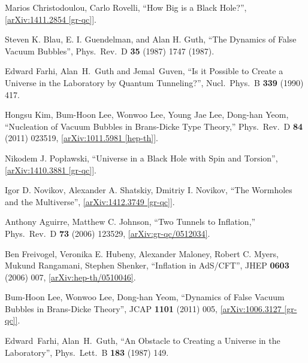 \documentclass[12pt]{article}
\newcommand{\2}{$^2$}
\newcommand{\3}{$^3$}
\newcommand{\4}{$_4$}
\newcommand{\5}{$_5$}
\begin{document}
\begin{thebibliography}{400}
Marios Christodoulou, Carlo Rovelli, ``How Big is a Black Hole?'', \href{http://arxiv.org/abs/1411.2854}{[arXiv:1411.2854 [gr-qc]]}. 

Steven K. Blau, E. I. Guendelman, and Alan H. Guth,
  ``The Dynamics of False Vacuum Bubbles'',
  Phys.\ Rev.\ D {\bf 35} (1987) 1747 (1987).

  Edward Farhi, Alan~H.~Guth and Jemal~Guven,
  ``Is it Possible to Create a Universe in the Laboratory by Quantum Tunneling?'',
  Nucl.\ Phys.\  B {\bf 339} (1990) 417.
	

  Hongsu Kim, Bum-Hoon Lee, Wonwoo Lee, Young Jae Lee, Dong-han Yeom,
  ``Nucleation of Vacuum Bubbles in Brans-Dicke Type Theory,''
  Phys.\ Rev.\ D {\bf 84} (2011) 023519, \href{http://arxiv.org/abs/1011.5981}{[arXiv:1011.5981 [hep-th]]}.
	
Nikodem J. Pop{\l}awski, ``Universe in a Black Hole with Spin and Torsion'', \href{http://arxiv.org/abs/1410.3881}{[arXiv:1410.3881 [gr-qc]]}.

Igor D. Novikov, Alexander A. Shatskiy,  Dmitriy I. Novikov, ``The Wormholes and the Multiverse'', \href{http://arxiv.org/abs/1412.3749}{[arXiv:1412.3749 [gr-qc]]}.


  Anthony Aguirre, Matthew C. Johnson,
  ``Two Tunnels to Inflation,''
  Phys.\ Rev.\ D {\bf 73} (2006) 123529, \href{http://arxiv.org/abs/gr-qc/0512034}{[arXiv:gr-qc/0512034]}.

  Ben Freivogel, Veronika E. Hubeny, Alexander Maloney, Robert C. Myers, Mukund Rangamani, Stephen Shenker,
  ``Inflation in AdS/CFT'',
  JHEP {\bf 0603} (2006) 007,
  \href{http://arxiv.org/abs/hep-th/0510046}{[arXiv:hep-th/0510046]}.

  Bum-Hoon Lee, Wonwoo Lee, Dong-han Yeom,
  ``Dynamics of False Vacuum Bubbles in Brans-Dicke Theory'',
  JCAP {\bf 1101} (2011) 005,
 \href{http://arxiv.org/abs/1006.3127}{[arXiv:1006.3127 [gr-qc]]}.

  Edward~Farhi, Alan~H.~Guth,
  ``An Obstacle to Creating a Universe in the Laboratory'',
  Phys.\ Lett.\ B {\bf 183} (1987) 149.


\end{thebibliography}
\end{document}
